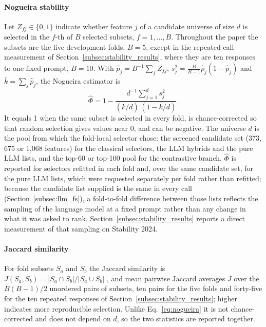 \documentclass[final,5p,twocolumn]{elsarticle}
\begin{document}
\paragraph{Nogueira stability}
Let $Z_{fj}\in\{0,1\}$ indicate whether feature $j$ of a candidate universe of size $d$ is selected in the $f$-th of $B$ selected subsets, $f=1,\dots,B$. Throughout the paper the subsets are the five development folds, $B=5$, except in the repeated-call measurement of Section~\ref{subsec:stability_results}, where they are ten responses to one fixed prompt, $B=10$. With $\hat p_j=B^{-1}\sum_f Z_{fj}$, $s_j^2=\frac{B}{B-1}\hat p_j(1-\hat p_j)$ and $\bar k=\sum_j \hat p_j$, the Nogueira estimator is \cite{nogueira2018}
\begin{equation}
    \hat\Phi=1-\frac{d^{-1}\sum_{j=1}^{d}s_j^2}{(\bar k/d)\,(1-\bar k/d)} .
    \label{eq:nogueira}
\end{equation}
It equals 1 when the same subset is selected in every fold, is chance-corrected so that random selection gives values near 0, and can be negative. The universe $d$ is the pool from which the fold-local selector chose: the screened candidate set (373, 675 or 1,068 features) for the classical selectors, the LLM hybrids and the pure LLM lists, and the top-60 or top-100 pool for the contrastive branch. $\hat\Phi$ is reported for selectors refitted in each fold and, over the same candidate set, for the pure LLM lists, which were requested separately per fold rather than refitted; because the candidate list supplied is the same in every call (Section~\ref{subsec:llm_fs}), a fold-to-fold difference between those lists reflects the sampling of the language model at a fixed prompt rather than any change in what it was asked to rank. Section~\ref{subsec:stability_results} reports a direct measurement of that sampling on Stability 2024.

\paragraph{Jaccard similarity}
For fold subsets $S_a$ and $S_b$ the Jaccard similarity is $J(S_a,S_b)=|S_a\cap S_b|/|S_a\cup S_b|$ \cite{jaccard1901}, and mean pairwise Jaccard averages $J$ over the $B(B-1)/2$ unordered pairs of subsets, ten pairs for the five folds and forty-five for the ten repeated responses of Section~\ref{subsec:stability_results}; higher indicates more reproducible selection. Unlike Eq.~\eqref{eq:nogueira} it is not chance-corrected and does not depend on $d$, so the two statistics are reported together.
\end{document}
